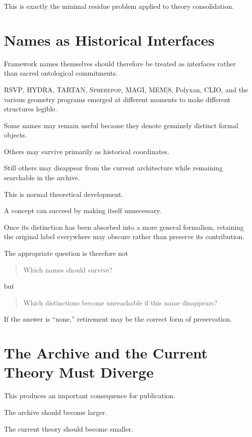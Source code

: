 \documentclass[11pt]{article}
\theoremstyle{remark}
\newcommand{\RSVP}{\textsc{RSVP}}
\newcommand{\HYDRA}{\textsc{HYDRA}}
\newcommand{\TARTAN}{\textsc{TARTAN}}
\newcommand{\MAGI}{\textsc{MAGI}}
\newcommand{\MEM}{\textsc{MEM|8}}
\newcommand{\Spherepop}{\textsc{Spherepop}}
\begin{document}
This is exactly the minimal residue problem applied to theory consolidation.

\section{Names as Historical Interfaces}

Framework names themselves should therefore be treated as interfaces rather
than sacred ontological commitments.

\RSVP{}, \HYDRA{}, \TARTAN{}, \Spherepop{}, \MAGI{}, \MEM{}, Polyxan, CLIO, and
the various geometry programs emerged at different moments to make different
structures legible.

Some names may remain useful because they denote genuinely distinct formal
objects.

Others may survive primarily as historical coordinates.

Still others may disappear from the current architecture while remaining
searchable in the archive.

This is normal theoretical development.

A concept can succeed by making itself unnecessary.

Once its distinction has been absorbed into a more general formalism, retaining
the original label everywhere may obscure rather than preserve its contribution.

The appropriate question is therefore not

\begin{quote}
Which names should survive?
\end{quote}

but

\begin{quote}
Which distinctions become unreachable if this name disappears?
\end{quote}

If the answer is ``none,'' retirement may be the correct form of preservation.

\section{The Archive and the Current Theory Must Diverge}

This produces an important consequence for publication.

The archive should become larger.

The current theory should become smaller.
\end{document}
